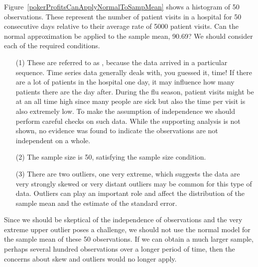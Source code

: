 \begin{example}{Figure~\ref{pokerProfitsCanApplyNormalToSampMean} shows a histogram of 50 observations. These represent the number of patient visits in a hospital for 50 consecutive days relative to their average rate of 5000 patient visits. Can the normal approximation be applied to the sample mean, 90.69?}
We should consider each of the required conditions.
\begin{itemize}
\setlength{\itemsep}{0mm}
\item[(1)] These are referred to as , because the data arrived in a particular sequence. Time series data generally deals with, you guessed it, time! If there are a lot of patients in the hospital one day, it may influence how many patients there are the day after. During the flu season, patient visits might be at an all time high since many people are sick but also the time per visit is also extremely low. To make the assumption of independence we should perform careful checks on such data. While the supporting analysis is not shown, no evidence was found to indicate the observations are not independent on a whole.
\item[(2)] The sample size is 50, satisfying the sample size condition.
\item[(3)] There are two outliers, one very extreme, which suggests the data are very strongly skewed or very distant outliers may be common for this type of data. Outliers can play an important role and affect the distribution of the sample mean and the estimate of the standard error.
\end{itemize}
Since we should be skeptical of the independence of observations and the very extreme upper outlier poses a challenge, we should not use the normal model for the sample mean of these 50 observations. If we can obtain a much larger sample, perhaps several hundred observations over a longer period of time, then the concerns about skew and outliers would no longer apply.
\end{example}

